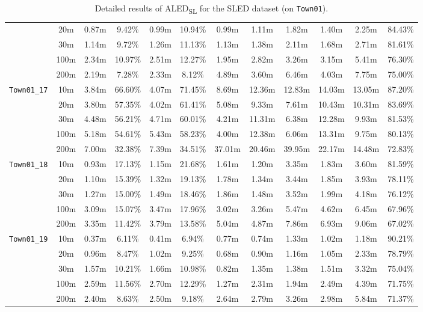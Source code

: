 \begin{table}
{\begin{tabular}{@{}cccccccccccc@{}}
      & 20m & 0.87m & 9.42\% & 0.99m & 10.94\% & 0.99m & 1.11m & 1.82m & 1.40m & 2.25m & 84.43\% \\
      & 30m & 1.14m & 9.72\% & 1.26m & 11.13\% & 1.13m & 1.38m & 2.11m & 1.68m & 2.71m & 81.61\% \\
      & 100m & 2.34m & 10.97\% & 2.51m & 12.27\% & 1.95m & 2.82m & 3.26m & 3.15m & 5.41m & 76.30\% \\
      & 200m & 2.19m & 7.28\% & 2.33m & 8.12\% & 4.89m & 3.60m & 6.46m & 4.03m & 7.75m & 75.00\% \\
      \midrule
      \multirow{5}{*}{\Verb|Town01_17|} & 10m & 3.84m & 66.60\% & 4.07m & 71.45\% & 8.69m & 12.36m & 12.83m & 14.03m & 13.05m & 87.20\% \\
      & 20m & 3.80m & 57.35\% & 4.02m & 61.41\% & 5.08m & 9.33m & 7.61m & 10.43m & 10.31m & 83.69\% \\
      & 30m & 4.48m & 56.21\% & 4.71m & 60.01\% & 4.21m & 11.31m & 6.38m & 12.28m & 9.93m & 81.53\% \\
      & 100m & 5.18m & 54.61\% & 5.43m & 58.23\% & 4.00m & 12.38m & 6.06m & 13.31m & 9.75m & 80.13\% \\
      & 200m & 7.00m & 32.38\% & 7.39m & 34.51\% & 37.01m & 20.46m & 39.95m & 22.17m & 14.48m & 72.83\% \\
      \midrule
      \multirow{5}{*}{\Verb|Town01_18|} & 10m & 0.93m & 17.13\% & 1.15m & 21.68\% & 1.61m & 1.20m & 3.35m & 1.83m & 3.60m & 81.59\% \\
      & 20m & 1.10m & 15.39\% & 1.32m & 19.13\% & 1.78m & 1.34m & 3.44m & 1.85m & 3.93m & 78.11\% \\
      & 30m & 1.27m & 15.00\% & 1.49m & 18.46\% & 1.86m & 1.48m & 3.52m & 1.99m & 4.18m & 76.12\% \\
      & 100m & 3.09m & 15.07\% & 3.47m & 17.96\% & 3.02m & 3.26m & 5.47m & 4.62m & 6.45m & 67.96\% \\
      & 200m & 3.35m & 11.42\% & 3.79m & 13.58\% & 5.04m & 4.87m & 7.86m & 6.93m & 9.06m & 67.02\% \\
      \midrule
      \multirow{5}{*}{\Verb|Town01_19|} & 10m & 0.37m & 6.11\% & 0.41m & 6.94\% & 0.77m & 0.74m & 1.33m & 1.02m & 1.18m & 90.21\% \\
      & 20m & 0.96m & 8.47\% & 1.02m & 9.25\% & 0.68m & 0.90m & 1.16m & 1.05m & 2.33m & 78.79\% \\
      & 30m & 1.57m & 10.21\% & 1.66m & 10.98\% & 0.82m & 1.35m & 1.38m & 1.51m & 3.32m & 75.04\% \\
      & 100m & 2.59m & 11.56\% & 2.70m & 12.29\% & 1.27m & 2.31m & 1.94m & 2.49m & 4.39m & 71.75\% \\
      & 200m & 2.40m & 8.63\% & 2.50m & 9.18\% & 2.64m & 2.79m & 3.26m & 2.98m & 5.84m & 71.37\% \\
      \bottomrule
    \end{tabular}
  }
  \cprotect\caption{Detailed results of ALED\textsubscript{SL} for the SLED dataset (on \verb|Town01|).}\label{tab:appendix:aled:full_res_sled_town01}
\end{table}

